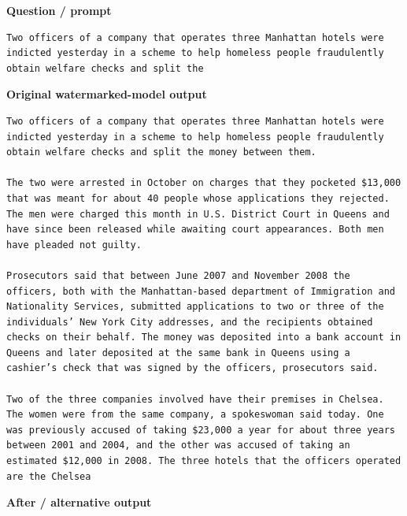 \textbf{Question / prompt}

\begin{Verbatim}
Two officers of a company that operates three Manhattan hotels were indicted yesterday in a scheme to help homeless people fraudulently obtain welfare checks and split the
\end{Verbatim}

\textbf{Original watermarked-model output}

\begin{Verbatim}
Two officers of a company that operates three Manhattan hotels were indicted yesterday in a scheme to help homeless people fraudulently obtain welfare checks and split the money between them.

The two were arrested in October on charges that they pocketed $13,000 that was meant for about 40 people whose applications they rejected. The men were charged this month in U.S. District Court in Queens and have since been released while awaiting court appearances. Both men have pleaded not guilty.

Prosecutors said that between June 2007 and November 2008 the officers, both with the Manhattan-based department of Immigration and Nationality Services, submitted applications to two or three of the individuals’ New York City addresses, and the recipients obtained checks on their behalf. The money was deposited into a bank account in Queens and later deposited at the same bank in Queens using a cashier’s check that was signed by the officers, prosecutors said.

Two of the three companies involved have their premises in Chelsea. The women were from the same company, a spokeswoman said today. One was previously accused of taking $23,000 a year for about three years between 2001 and 2004, and the other was accused of taking an estimated $12,000 in 2008. The three hotels that the officers operated are the Chelsea
\end{Verbatim}

\textbf{After / alternative output}

